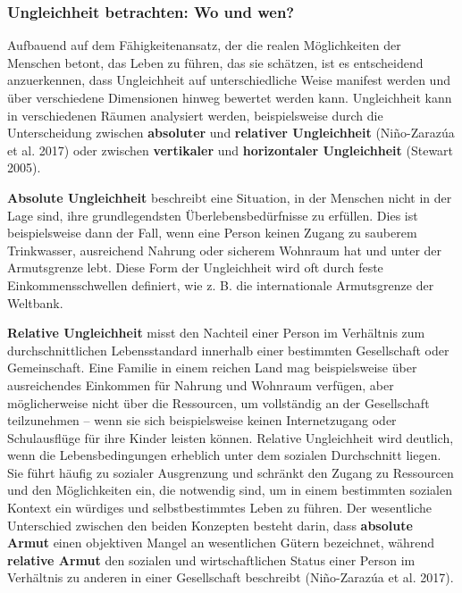 \documentclass[
  nswissgerman,
  a4paper,
  DIV=11,
  numbers=noendperiod,
  oneside,
  openany]{scrreprt}
\begin{document}
\subsubsection{Ungleichheit betrachten: Wo und
wen?}\label{ungleichheit-betrachten-wo-und-wen}

Aufbauend auf dem Fähigkeitenansatz, der die realen Möglichkeiten der
Menschen betont, das Leben zu führen, das sie schätzen, ist es
entscheidend anzuerkennen, dass Ungleichheit auf unterschiedliche Weise
manifest werden und über verschiedene Dimensionen hinweg bewertet werden
kann. Ungleichheit kann in verschiedenen Räumen analysiert werden,
beispielsweise durch die Unterscheidung zwischen \textbf{absoluter} und
\textbf{relativer Ungleichheit} (Niño-Zarazúa et al. 2017) oder zwischen
\textbf{vertikaler} und \textbf{horizontaler Ungleichheit} (Stewart
2005).

\textbf{Absolute Ungleichheit} beschreibt eine Situation, in der
Menschen nicht in der Lage sind, ihre grundlegendsten
Überlebensbedürfnisse zu erfüllen. Dies ist beispielsweise dann der
Fall, wenn eine Person keinen Zugang zu sauberem Trinkwasser,
ausreichend Nahrung oder sicherem Wohnraum hat und unter der
Armutsgrenze lebt. Diese Form der Ungleichheit wird oft durch feste
Einkommensschwellen definiert, wie z. B. die internationale Armutsgrenze
der Weltbank.

\textbf{Relative Ungleichheit} misst den Nachteil einer Person im
Verhältnis zum durchschnittlichen Lebensstandard innerhalb einer
bestimmten Gesellschaft oder Gemeinschaft. Eine Familie in einem reichen
Land mag beispielsweise über ausreichendes Einkommen für Nahrung und
Wohnraum verfügen, aber möglicherweise nicht über die Ressourcen, um
vollständig an der Gesellschaft teilzunehmen -- wenn sie sich
beispielsweise keinen Internetzugang oder Schulausflüge für ihre Kinder
leisten können. Relative Ungleichheit wird deutlich, wenn die
Lebensbedingungen erheblich unter dem sozialen Durchschnitt liegen. Sie
führt häufig zu sozialer Ausgrenzung und schränkt den Zugang zu
Ressourcen und den Möglichkeiten ein, die notwendig sind, um in einem
bestimmten sozialen Kontext ein würdiges und selbstbestimmtes Leben zu
führen. Der wesentliche Unterschied zwischen den beiden Konzepten
besteht darin, dass \textbf{absolute Armut} einen objektiven Mangel an
wesentlichen Gütern bezeichnet, während \textbf{relative Armut} den
sozialen und wirtschaftlichen Status einer Person im Verhältnis zu
anderen in einer Gesellschaft beschreibt (Niño-Zarazúa et al. 2017).
\end{document}
